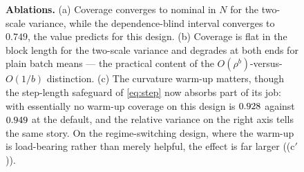 \begin{figure}[tbp]
\centering
{}
\caption{\textbf{Ablations.} (a) Coverage converges to nominal in $N$ for the two-scale variance,
while the dependence-blind interval converges to $0.749$, the value  predicts
for this design. (b) Coverage is flat in the block length for the two-scale variance and degrades at
both ends for plain batch means --- the practical content of the $O(\rho^b)$-versus-$O(1/b)$
distinction. (c) The curvature warm-up matters, though the step-length safeguard of \eqref{eq:step}
now absorbs part of its job: with essentially no warm-up coverage on this design is $0.928$
against $0.949$ at the default, and the relative variance on the right axis tells the same
story. On the regime-switching design, where the warm-up is load-bearing rather than merely
helpful, the effect is far larger ((c$'$)).}
\label{fig:ablation}
\end{figure}
